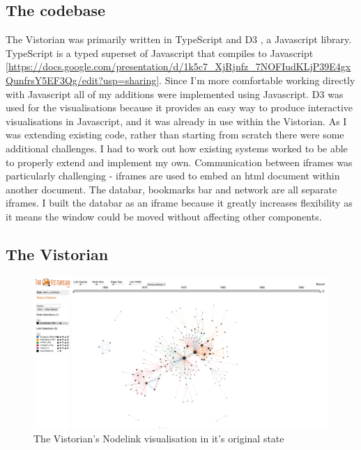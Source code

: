 \subsection{The codebase}
\label{sec:sec24}
The Vistorian was primarily written in TypeScript and D3 \cite{d3site}, a Javascript library. TypeScript is a typed superset of Javascript that compiles to Javascript \ref{https://docs.google.com/presentation/d/1k5c7_XjRjnfz_7NOFIudKLjP39E4gxQunfrsY5EF3Qg/edit?usp=sharing}. Since I'm more comfortable working directly with Javascript all of my additions were implemented using Javascript. D3 was used for the visualisations because it provides an easy way to produce interactive visualisations in Javascript, and it was already in use within the Vistorian. 
As I was extending existing code, rather than starting from scratch there were some additional challenges. I had to work out how existing systems worked to be able to properly extend and implement my own. Communication between iframes was particularly challenging - iframes are used to embed an html document within another document. The databar, bookmarks bar and network are all separate iframes. I built the databar as an iframe because it greatly increases flexibility as it means the window could be moved without affecting other components.

\subsection{The Vistorian}

\begin{figure}[h!]
  \begin{center}
  \includegraphics[trim={0 0 0 0}, width=140mm]{./Figures/vistorianOriginal.png}
  \caption{The Vistorian's Nodelink visualisation in it's original state}
  \label{fig:vistorianOriginal}
  \end{center}
\end{figure}

